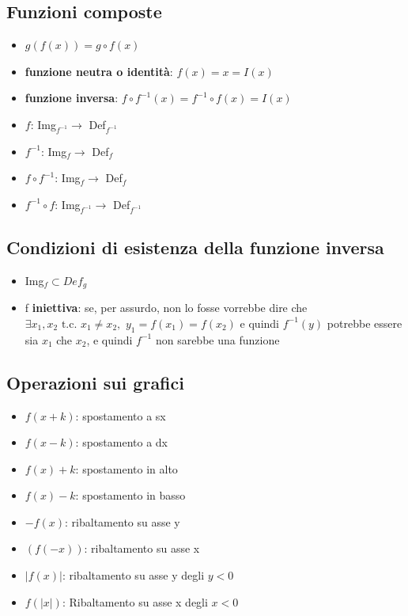 \documentclass{report}
\begin{document}
    \subsection{Funzioni composte}
    \begin{itemize}
        \item $g(f(x)) = g \circ f(x)$
        \item \textbf{funzione neutra o identità}: $f(x) = x = I(x)$
        \item \textbf{funzione inversa}: $f \circ f^{-1}(x) = f^{-1} \circ f(x) = I(x)$
        \item $f$: Img$_{f^{-1}} \longrightarrow$ Def$_{f^{-1}}$
        \item $f^{-1}$: Img$_f \longrightarrow$ Def$_f$
        \item $f \circ f^{-1}$: Img$_f \longrightarrow$ Def$_f$
        \item $f^{-1} \circ f$: Img$_{f^{-1}} \longrightarrow$ Def$_{f^{-1}}$
    \end{itemize}
        \subsection{Condizioni di esistenza della funzione inversa}
            \begin{itemize}
                \item Img$_f \subset Def_g$ 
                \item f \textbf{iniettiva}: se, per assurdo, non lo fosse vorrebbe dire 
                    che $\exists x_1,x_2 \textrm{ t.c. } x_1 \neq x_2, \, \, y_1 = f(x_1) = f(x_2)$ e quindi
                    $f^{-1}(y)$ potrebbe essere sia $x_1$ che $x_2$, e quindi $f^{-1}$
                    non sarebbe una funzione
            \end{itemize}
    \subsection{Operazioni sui grafici}
        \begin{itemize}
            \item $f(x+k)$: spostamento a sx
            \item $f(x-k)$: spostamento a dx
            \item $f(x) + k$: spostamento in alto
            \item $f(x) - k$: spostamento in basso
            \item $-f(x)$: ribaltamento su asse y
            \item $(f(-x))$: ribaltamento su asse x
            \item $|f(x)|$: ribaltamento su asse y degli $y < 0$
            \item $f(|x|)$: Ribaltamento su asse x degli $x < 0$
        \end{itemize}
\end{document}

